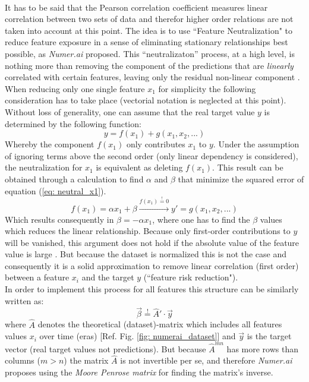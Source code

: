 \documentclass[12pt, a4paper]{article}
\begin{document}
\\
It has to be said that the Pearson correlation coefficient measures linear correlation between two sets of data and therefor higher order relations are not taken into account at this point. The idea is to use ``Feature Neutralization" to reduce feature exposure in a sense of eliminating stationary relationships best possible, as \textit{Numer.ai} proposed. This ``neutralizaton'' process, at a high level, is nothing more than removing the component of the predictions that are \textit{linearly} correlated with certain features, leaving only the residual non-linear component \cite{Numerai}. When reducing only one single feature $x_1$ for simplicity the following consideration has to take place (vectorial notation is neglected at this point). Without loss of generality, one can assume that the real target value $y$ is determined by the following function:
\begin{equation}
\label{eq: neutral_x1}
    y = f(x_1) + g(x_1, x_2,...)
\end{equation}
Whereby the component $f(x_1)$ only contributes $x_1$ to $y$. Under the assumption of ignoring terms above the second order (only linear dependency is considered), the neutralization for $x_1$ is equivalent as deleting $f(x_1)$. This result can be obtained through a calculation to find $\alpha$ and $\beta$ that minimize the squared error of equation (\ref{eq: neutral_x1}).
\begin{equation}
    \label{eq: neutral_scalar}
    f(x_1) = \alpha x_1 + \beta \xrightarrow{f(x_1) \overset{!}{=} 0} y' = g(x_1,x_2,...)
\end{equation}
Which results consequently in $\beta = - \alpha x_1$, where one has to find the $\beta$ values which reduces the linear relationship. Because only first-order contributions to $y$ will be vanished, this argument does not hold if the absolute value of the feature value is large \cite{Bobyfish2022}. But because the dataset is normalized this is not the case and consequently it is a solid approximation to remove linear correlation (first order) between a feature $x_i$ and the target $y$ (``feature risk reduction").\\
In order to implement this process for all features this structure can be similarly written as:
\begin{equation}
    \vec{\beta} \overset{!}{=} \hat{A}' \cdot \vec{y}
\end{equation}
where $\hat{A}$ denotes the theoretical (dataset)-matrix which includes all features values $x_i$ over time (eras) [Ref. Fig. \ref{fig: numerai_dataset}] and $\vec{y}$ is the target vector (real target values not predictions). But because $\hat{A}^{mn}$ has more rows than columns ($m > n$) the matrix $\hat{A}$ is not invertible per se, and therefore \textit{Numer.ai} \cite{Bobyfish2022} proposes using the \textit{Moore Penrose matrix} for finding the matrix's inverse. \\
\end{document}
